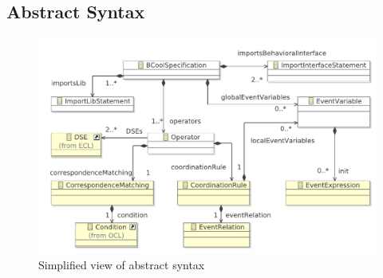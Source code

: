 \subsection{Abstract Syntax}
\begin{figure}
	\center
	\includegraphics[width=.8\textwidth]{bcool/figs/BcoolMM}
	\caption{Simplified view of \bcool abstract syntax}
	\label{fig:bcool}
\end{figure}

